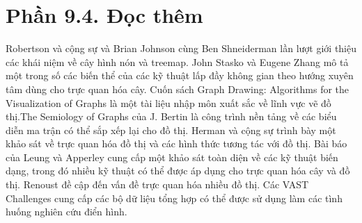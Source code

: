 \documentclass[12pt,a4paper, openany]{book}
\begin{document}
\chapter*{Phần 9.4. \newline Đọc thêm}

Robertson và cộng sự \cite{robertson1991} và Brian Johnson cùng Ben Shneiderman \cite{johnson1991} lần lượt giới thiệu các khái niệm về cây hình nón và treemap. John Stasko và Eugene Zhang \cite{stasko2000} mô tả một trong số các biến thể của các kỹ thuật lấp đầy không gian theo hướng xuyên tâm dùng cho trực quan hóa cây. Cuốn sách Graph Drawing: Algorithms for the Visualization of Graphs \cite{dibattista1998} là một tài liệu nhập môn xuất sắc về lĩnh vực vẽ đồ thị.The Semiology of Graphs \cite{bertin1983} của J. Bertin là công trình nền tảng về các biểu diễn ma trận có thể sắp xếp lại cho đồ thị. Herman và cộng sự \cite{herman2000} trình bày một khảo sát về trực quan hóa đồ thị và các hình thức tương tác với đồ thị. Bài báo của Leung và Apperley \cite{leung1994} cung cấp một khảo sát toàn diện về các kỹ thuật biến dạng, trong đó nhiều kỹ thuật có thể được áp dụng cho trực quan hóa cây và đồ thị. Renoust \cite{renoust2014} đề cập đến vấn đề trực quan hóa nhiều đồ thị. Các VAST Challenges cung cấp các bộ dữ liệu tổng hợp có thể được sử dụng làm các tình huống nghiên cứu điển hình.


%
%
\renewcommand{\bibname}{Tài liệu tham khảo}
\end{document}

